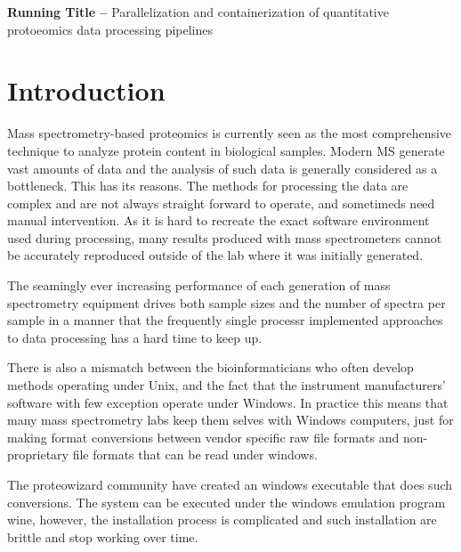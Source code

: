 \documentclass[11pt]{article}
\begin{document}
\maketitle

{ {\bf Running Title -- } Parallelization and containerization of quantitative protoeomics data processing pipelines}

\begin{abstract}


\end{abstract}

\section*{Introduction}

Mass spectrometry-based proteomics is currently seen as the most comprehensive technique to analyze protein content in biological samples. Modern MS generate vast amounts of data and the analysis of such data is generally considered as a bottleneck. This has its reasons. The methods for processing the data are complex and are not always straight forward to operate, and sometimeds need manual intervention. As it is hard to recreate the exact software environment used during processing, many results produced with mass spectrometers cannot be accurately reproduced outside of the lab where it was initially generated.

The seamingly ever increasing performance of each generation of mass spectrometry equipment drives both sample sizes and the number of spectra per sample in a manner that the frequently single processr implemented approaches to data processing has a hard time to keep up.

There is also a mismatch between the bioinformaticians who often develop methods operating under Unix, and the fact that the instrument manufacturers' software with few exception operate under Windows. In practice this means that many mass spectrometry labs keep them selves with Windows computers, just for making format conversions between vendor specific raw file formats and non-proprietary file formats that can be read under windows.

The proteowizard community have created an windows executable that does such conversions. The system can be executed under the windows emulation program wine, however, the installation process is complicated and such installation are brittle and stop working over time.
\end{document}
